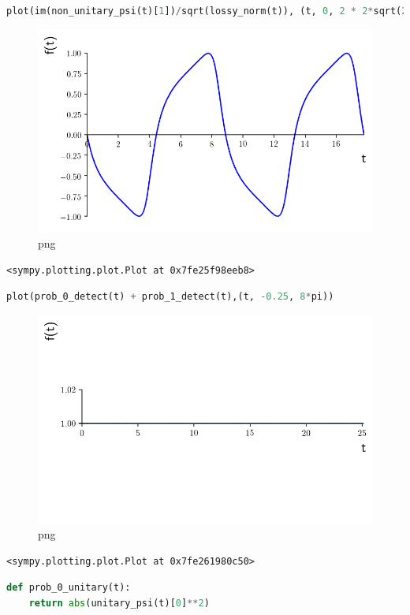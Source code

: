 \begin{lstlisting}[language=Python]
plot(im(non_unitary_psi(t)[1])/sqrt(lossy_norm(t)), (t, 0, 2 * 2*sqrt(2)*pi), line_color='b')
\end{lstlisting}

\begin{figure}
\centering
\includegraphics[width=0.6\linewidth]{output_37_0.png}
\caption[]{png}
\end{figure}

\begin{lstlisting}
<sympy.plotting.plot.Plot at 0x7fe25f98eeb8>
\end{lstlisting}

\begin{lstlisting}[language=Python]
plot(prob_0_detect(t) + prob_1_detect(t),(t, -0.25, 8*pi))
\end{lstlisting}

\begin{figure}
\centering
\includegraphics[width=0.6\linewidth]{output_38_0.png}
\caption[]{png}
\end{figure}

\begin{lstlisting}
<sympy.plotting.plot.Plot at 0x7fe261980c50>
\end{lstlisting}

\begin{lstlisting}[language=Python]
def prob_0_unitary(t):
    return abs(unitary_psi(t)[0]**2)
\end{lstlisting}

